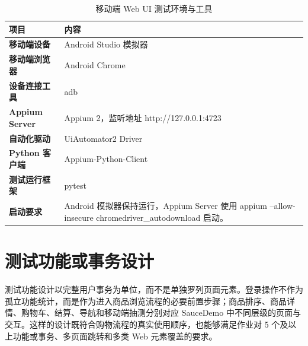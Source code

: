 \documentclass[UTF8,a4paper,12pt]{ctexart}
\begin{document}
\begin{table}[H]
\centering
\caption{移动端 Web UI 测试环境与工具}
\begin{tabularx}{\textwidth}{>{\bfseries}p{3.2cm}X}
\toprule
项目 & 内容 \\
\midrule
移动端设备 & Android Studio 模拟器 \\
移动端浏览器 & Android Chrome \\
设备连接工具 & adb \\
Appium Server & Appium 2，监听地址 http://127.0.0.1:4723 \\
自动化驱动 & UiAutomator2 Driver \\
Python 客户端 & Appium-Python-Client \\
测试运行框架 & pytest \\
启动要求 & Android 模拟器保持运行，Appium Server 使用 appium --allow-insecure chromedriver\_autodownload 启动。 \\
\bottomrule
\end{tabularx}
\end{table}

\section{测试功能或事务设计}

测试功能设计以完整用户事务为单位，而不是单独罗列页面元素。登录操作不作为孤立功能统计，而是作为进入商品浏览流程的必要前置步骤；商品排序、商品详情、购物车、结算、导航和移动端抽测分别对应 SauceDemo 中不同层级的页面与交互。这样的设计既符合购物流程的真实使用顺序，也能够满足作业对 5 个及以上功能或事务、多页面跳转和多类 Web 元素覆盖的要求。
\end{document}

